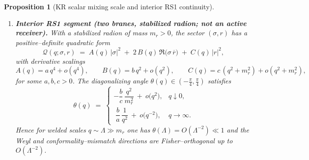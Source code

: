 \documentclass[10pt]{article}
\theoremstyle{definition}
\theoremstyle{plain}
\newtheorem{proposition}{Proposition}[section]
\begin{document}
\begin{proposition}[KR scalar mixing scale and interior RS1 continuity]
\begin{enumerate}[leftmargin=2.0em,label=(\roman*)]
\item \textbf{Interior RS1 segment (two branes, stabilized radion; not an active receiver).}
With a stabilized radion of mass $m_r>0$, the sector $(\sigma,r)$ has a positive–definite quadratic form
\begin{equation}
\label{eq:scalar-kernel}
\mathcal Q(q;\sigma,r)\;=\;
A(q)\,|\sigma|^2\;+\;2\,B(q)\,\Re\big(\sigma\,\overline{r}\big)\;+\;C(q)\,|r|^2,
\end{equation}
with derivative scalings
\begin{equation}
\label{eq:ABC-scaling}
A(q)=a\,q^{4}+o(q^{4}),\qquad
B(q)=b\,q^{2}+o(q^{2}),\qquad
C(q)=c\,(q^{2}+m_{r}^{2})+o(q^{2}+m_{r}^{2}),
\end{equation}
for some $a,b,c>0$. The diagonalizing angle $\theta(q)\in(-\frac\pi4,\frac\pi4)$ satisfies
\begin{equation}
\label{eq:theta-asymp}
\theta(q)\;=\;
\begin{cases}
-\dfrac{b}{c}\,\dfrac{q^{2}}{m_{r}^{2}}\ +\ o\!\big(q^{2}\big), & q\downarrow 0,\\[8pt]
\;\dfrac{b}{a}\,\dfrac{1}{q^{2}}\ +\ o\!\big(q^{-2}\big), & q\to\infty.
\end{cases}
\end{equation}
Hence for welded scales $q\sim\Lambda\gg m_r$ one has $\theta(\Lambda)=O(\Lambda^{-2})\ll 1$ and the
Weyl and conformality–mismatch directions are Fisher–orthogonal up to $O(\Lambda^{-2})$.
\end{enumerate}
\end{proposition}
\end{document}
